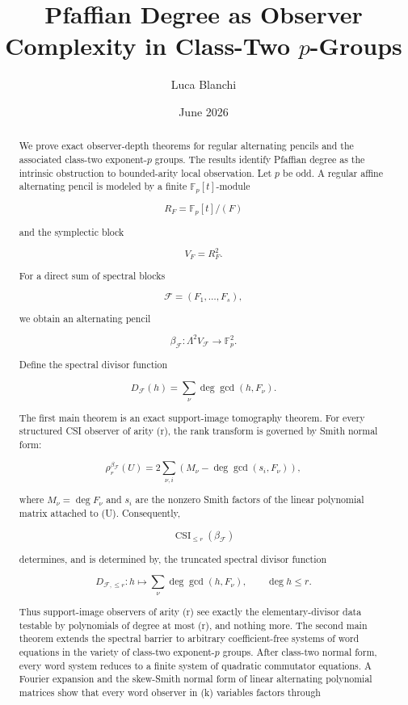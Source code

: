 \documentclass[11pt]{article}
\title{Pfaffian Degree as Observer Complexity in Class-Two $p$-Groups}
\author{Luca Blanchi}
\date{June 2026}
\begin{document}
\maketitle

\begin{abstract}
We prove exact observer-depth theorems for regular alternating pencils and the associated class-two exponent-$p$ groups. The results identify Pfaffian degree as the intrinsic obstruction to bounded-arity local observation. Let $p$ be odd. A regular affine alternating pencil is modeled by a finite $\mathbb F_p[t]$-module

\[
R_F=\mathbb F_p[t]/(F)
\]

and the symplectic block

\[
V_F=R_F^2.
\]

For a direct sum of spectral blocks

\[
\mathcal F=(F_1,\ldots,F_s),
\]

we obtain an alternating pencil

\[
\beta_{\mathcal F}:\Lambda^2V_{\mathcal F}\to \mathbb F_p^2.
\]

Define the spectral divisor function

\[
D_{\mathcal F}(h)
=\sum_\nu \deg\gcd(h,F_\nu).
\]

The first main theorem is an exact support-image tomography theorem. For every structured CSI observer of arity (r), the rank transform is governed by Smith normal form:

\[
\rho_r^{\beta_{\mathcal F}}(U)
=2\sum_{\nu,i}
\left(
M_\nu-\deg\gcd(s_i,F_\nu)
\right),
\]

where $M_\nu=\deg F_\nu$ and $s_i$ are the nonzero Smith factors of the linear polynomial matrix attached to (U). Consequently,

\[
\operatorname{CSI}_{\le r}(\beta_{\mathcal F})
\]

determines, and is determined by, the truncated spectral divisor function

\[
D_{\mathcal F,\le r}:
h\longmapsto
\sum_\nu \deg\gcd(h,F_\nu),
\qquad
\deg h\le r.
\]

Thus support-image observers of arity (r) see exactly the elementary-divisor data testable by polynomials of degree at most (r), and nothing more. The second main theorem extends the spectral barrier to arbitrary coefficient-free systems of word equations in the variety of class-two exponent-$p$ groups. After class-two normal form, every word system reduces to a finite system of quadratic commutator equations. A Fourier expansion and the skew-Smith normal form of linear alternating polynomial matrices show that every word observer in (k) variables factors through


\end{abstract}
\end{document}
